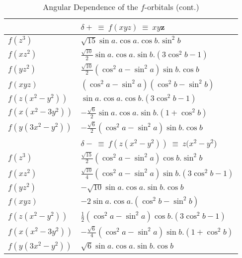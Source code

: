 \begin{table}
\caption{\label{f_rot2} Angular Dependence of the $f$-orbitals (cont.)}
\begin{tabular}{|l|l|} \hline
 & $\delta + \ \equiv \ f(xyz) \ \equiv \ xy$z\\ \hline
$f(z^3)$ & $\sqrt{15}\sin a.\cos a.\cos b.\sin^2b$ \\
$f(xz^2)$ & $\frac{\sqrt{10}}{2}\sin a.\cos a.\sin b.(3\cos^2b-1)$ \\
$f(yz^2)$ & $\frac{\sqrt{10}}{2}(\cos^2a-\sin^2a)\sin b.\cos b$ \\
$f(xyz)$ & $(\cos^2a-\sin^2a)(\cos^2b-\sin^2b)$ \\
$f(z(x^2-y^2))$ & $\sin a.\cos a.\cos b.(3\cos^2b-1)$ \\
$f(x(x^2-3y^2))$ & $-\frac{\sqrt{6}}{2}\sin a.\cos a.\sin b.(1+\cos^2b)$ \\
$f(y(3x^2-y^2))$ & $-\frac{\sqrt{6}}{2}(\cos^2a-\sin^2a)\sin b.\cos b$ \\ \hline
 & $\delta -\ \equiv \ f(z(x^2-y^2)) \ \equiv \ z(x^2-y^2$)\\ \hline
$f(z^3)$ & $\frac{\sqrt{15}}{2}(\cos^2a-\sin^2a)\cos b.\sin^2b$ \\
$f(xz^2)$ & $\frac{\sqrt{10}}{4}(\cos^2a-\sin^2a)\sin b.(3\cos^2b-1)$ \\
$f(yz^2)$ & $-\sqrt{10}\sin a.\cos a.\sin b.\cos b$ \\
$f(xyz)$ & $-2\sin a.\cos a.(\cos^2b-\sin^2b)$ \\
$f(z(x^2-y^2))$ & $\frac{1}{2}(\cos^2a-\sin^2a)\cos b.(3\cos^2b-1)$ \\
$f(x(x^2-3y^2))$ & $-\frac{\sqrt{6}}{4}(\cos^2a-\sin^2a)\sin b.(1+\cos^2b)$ \\
$f(y(3x^2-y^2))$ & $\sqrt{6}\sin a.\cos a.\sin b.\cos b$ \\ \hline
\end{tabular}


\end{table}
